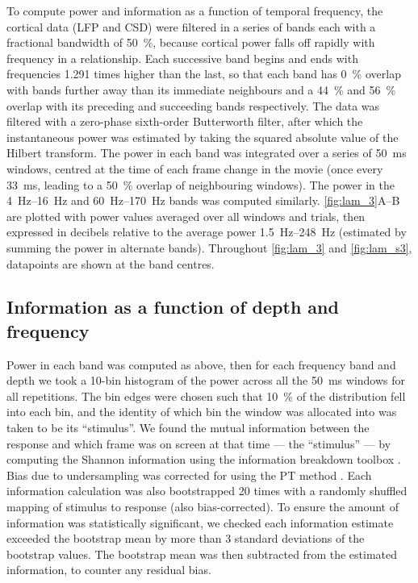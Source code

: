 To compute power and information as a function of temporal frequency, the cortical data (\ac{LFP} and \ac{CSD}) were filtered in a series of bands each with a fractional bandwidth of \SI{50}{\percent}, because cortical power falls off rapidly with frequency in a  relationship.
Each successive band begins and ends with frequencies 1.291 times higher than the last, so that each band has \SI{0}{\percent} overlap with bands further away than its immediate neighbours and a \SI{44}{\percent} and \SI{56}{\percent} overlap with its preceding and succeeding bands respectively.
The data was filtered with a zero-phase sixth-order Butterworth filter, after which the instantaneous power was estimated by taking the squared absolute value of the Hilbert transform.
The power in each band was integrated over a series of \SI{50}{\milli\second} windows, centred at the time of each frame change in the movie (once every \SI{33}{\milli\second}, leading to a \SI{50}{\percent} overlap of neighbouring windows).
The power in the \SIrange{4}{16}{Hz} and \SIrange{60}{170}{Hz} bands was computed similarly.
\autoref{fig:lam_3}A--B are plotted with power values averaged over all windows and trials, then expressed in decibels relative to the average power \SIrange{1.5}{248}{Hz} (estimated by summing the power in alternate bands).
Throughout \autoref{fig:lam_3} and \autoref{fig:lam_s3}, datapoints are shown at the band centres.


\subsection{Information as a function of depth and frequency}

Power in each band was computed as above, then for each frequency band and depth we took a \num{10}-bin histogram of the power across all the \SI{50}{\milli\second} windows for all repetitions.
The bin edges were chosen such that \SI{10}{\percent} of the distribution fell into each bin, and the identity of which bin the window was allocated into was taken to be its ``stimulus''.
We found the mutual information between the response and which frame was on screen at that time --- the ``stimulus'' --- by computing the Shannon information using the information breakdown toolbox \citep{Magri2009}.
Bias due to undersampling was corrected for using the \ac{PT} method \citep{Treves1995}.
Each information calculation was also bootstrapped \num{20} times with a randomly shuffled mapping of stimulus to response (also bias-corrected).
To ensure the amount of information was statistically significant, we checked each information estimate exceeded the bootstrap mean by more than \num{3} standard deviations of the bootstrap values.
The bootstrap mean was then subtracted from the estimated information, to counter any residual bias.


